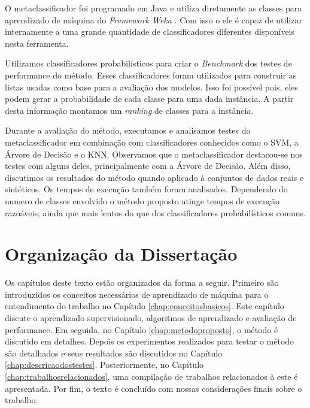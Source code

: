 O metaclassificador foi programado em Java e utiliza diretamente as classes para aprendizado de máquina do \textit{Framework Weka} \cite{Hall}.
Com isso o ele é capaz de utilizar internamente a uma grande quantidade de classificadores diferentes disponíveis nesta ferramenta.

Utilizamos classificadores probabilísticos para criar o \textit{Benchmark} dos testes de performance do método. 
Esses classificadores foram utilizados para construir as listas usadas como base para a avaliação dos modelos.
Isso foi possível pois, eles podem gerar a probabilidade de cada classe para uma dada instância.
A partir desta informação montamos um \textit{ranking} de classes para a instância.

Durante a avaliação do método, executamos e analisamos testes do metaclassificador em combinação com classificadores conhecidos como o SVM, a Árvore de Decisão e o KNN.
Observamos que o metaclassificador destacou-se nos testes com alguns deles, principalmente com a Árvore de Decisão.
Além disso, discutimos os resultados do método quando aplicado à conjuntos de dados reais e sintéticos.
Os tempos de execução também foram analisados.
Dependendo do numero de classes envolvido o método proposto atinge tempos de execução razoáveis; ainda que mais lentos do que dos classificadores probabilísticos comuns.

\section{Organização da Dissertação}

Os capítulos deste texto estão organizados da forma a seguir.
Primeiro são introduzidos os conceitos necessários de aprendizado de máquina para o entendimento do trabalho no Capítulo \ref{chap:conceitosbasicos}.
Este capítulo discute o aprendizado supervisionado, algoritmos de aprendizado e avaliação de performance.
Em seguida, no Capítulo \ref{chap:metodoproposto}, o método é discutido em detalhes.
Depois os experimentos realizados para testar o método são detalhados e seus resultados são discutidos no Capítulo \ref{chap:descricaodostestes}.
Posteriormente, no Capítulo \ref{chap:trabalhosrelacionados}, uma compilação de trabalhos relacionados à este é apresentada.
Por fim, o texto é concluído com nossas considerações finais sobre o trabalho.
